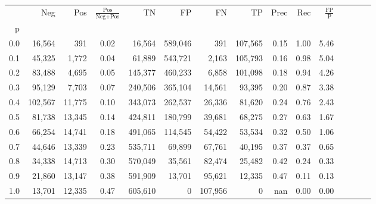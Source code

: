\begin{tabular}{rrrcrrrrrrrrrrr}
\toprule
{} &      Neg &     Pos & $\frac{\text{Pos}}{\text{Neg}+\text{Pos}}$ &       TN &       FP &       FN &       TP &  Prec &   Rec & $\frac{\text{FP}}{\text{P}}$ \\
p   &          &         &                                            &          &          &          &          &       &       &                              \\
\midrule
0.0 &   16,564 &     391 &                                       0.02 &   16,564 &  589,046 &      391 &  107,565 &  0.15 &  1.00 &                         5.46 \\
0.1 &   45,325 &   1,772 &                                       0.04 &   61,889 &  543,721 &    2,163 &  105,793 &  0.16 &  0.98 &                         5.04 \\
0.2 &   83,488 &   4,695 &                                       0.05 &  145,377 &  460,233 &    6,858 &  101,098 &  0.18 &  0.94 &                         4.26 \\
0.3 &   95,129 &   7,703 &                                       0.07 &  240,506 &  365,104 &   14,561 &   93,395 &  0.20 &  0.87 &                         3.38 \\
0.4 &  102,567 &  11,775 &                                       0.10 &  343,073 &  262,537 &   26,336 &   81,620 &  0.24 &  0.76 &                         2.43 \\
0.5 &   81,738 &  13,345 &                                       0.14 &  424,811 &  180,799 &   39,681 &   68,275 &  0.27 &  0.63 &                         1.67 \\
0.6 &   66,254 &  14,741 &                                       0.18 &  491,065 &  114,545 &   54,422 &   53,534 &  0.32 &  0.50 &                         1.06 \\
0.7 &   44,646 &  13,339 &                                       0.23 &  535,711 &   69,899 &   67,761 &   40,195 &  0.37 &  0.37 &                         0.65 \\
0.8 &   34,338 &  14,713 &                                       0.30 &  570,049 &   35,561 &   82,474 &   25,482 &  0.42 &  0.24 &                         0.33 \\
0.9 &   21,860 &  13,147 &                                       0.38 &  591,909 &   13,701 &   95,621 &   12,335 &  0.47 &  0.11 &                         0.13 \\
1.0 &   13,701 &  12,335 &                                       0.47 &  605,610 &        0 &  107,956 &        0 &   nan &  0.00 &                         0.00 \\
\bottomrule
\end{tabular}
